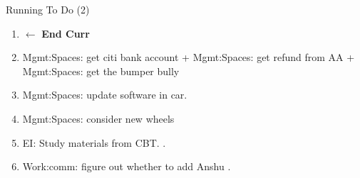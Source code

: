 \begin{frame}{Running To Do (2)} 
  \begin{enumerate}
\conti    
         \item[] \tiny  $\leftarrow$ \textbf{End Curr}
         \item \tiny Mgmt:Spaces: get citi bank account + Mgmt:Spaces: get refund from AA  + Mgmt:Spaces: get the bumper bully 
          \item \tiny Mgmt:Spaces: update software  in car. 
        \item \tiny  Mgmt:Spaces: consider new wheels 
        \item \tiny EI: Study materials from CBT.   .
        \item \tiny Work:comm: figure out whether to add Anshu .
    \end{enumerate}
    
 \end{frame}

